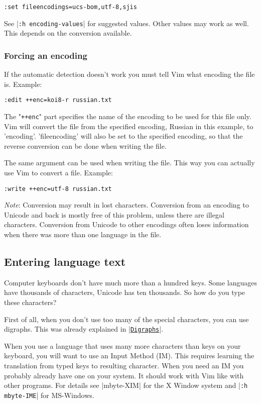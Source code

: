 \begin{Verbatim}[samepage=true]
 :set fileencodings=ucs-bom,utf-8,sjis
\end{Verbatim}

See |\verb!:h encoding-values!| for suggested values.
Other values may work as well.
This depends on the conversion available.

\subsubsection{Forcing an encoding}
If the automatic detection doesn't work you must tell Vim what encoding the file is.
Example:

\begin{Verbatim}[samepage=true]
 :edit ++enc=koi8-r russian.txt
\end{Verbatim}

The "\verb!++enc!" part specifies the name of the encoding to be used for this file only.
Vim will convert the file from the specified encoding, Russian in this example, to 'encoding'.
'fileencoding' will also be set to the specified encoding, so that the reverse conversion can be done when writing the file.

The same argument can be used when writing the file.
This way you can actually use Vim to convert a file.
Example:

\begin{Verbatim}[samepage=true]
 :write ++enc=utf-8 russian.txt
\end{Verbatim}
 
\emph{Note}: Conversion may result in lost characters.
Conversion from an encoding to Unicode and back is mostly free of this problem, unless there are illegal characters.
Conversion from Unicode to other encodings often loses information when there was more than one language in the file.
\subsection{Entering language text}
\label{Entering language text}
Computer keyboards don't have much more than a hundred keys.
Some languages have thousands of characters, Unicode has ten thousands.
So how do you type these characters?

First of all, when you don't use too many of the special characters, you can use digraphs.
This was already explained in |\hyperref[Digraphs]{\texttt{Digraphs}}|.

When you use a language that uses many more characters than keys on your keyboard, you will want to use an Input Method (IM).
This requires learning the translation from typed keys to resulting character.
When you need an IM you probably already have one on your system.
It should work with Vim like with other programs.
For details see |mbyte-XIM| for the X Window system and |\verb!:h mbyte-IME!| for MS-Windows.

